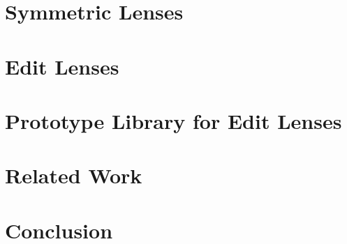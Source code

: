 \documentclass[12pt]{report}
\numberwithin{equation}{section}
\begin{document}
\chapter{Symmetric Lenses}
\label{chap:complement}
\label{chap:symmetric}
\label{chap:symmetry}
\label{chap:symm}



\chapter{Edit Lenses}
\label{chap:delta}
\label{chap:edits}
\label{chap:edit}

\mlinjargs\mlinjnoargs

%
%
%
%
%

\ifimpl
\chapter{Prototype Library for Edit Lenses}
\label{chap:implementation}
\label{chap:impl}


\fi%

\chapter{Related Work}
\label{chap:related}



\chapter{Conclusion}
\label{chap:conclusion}
\label{chap:conc}





\end{document}
